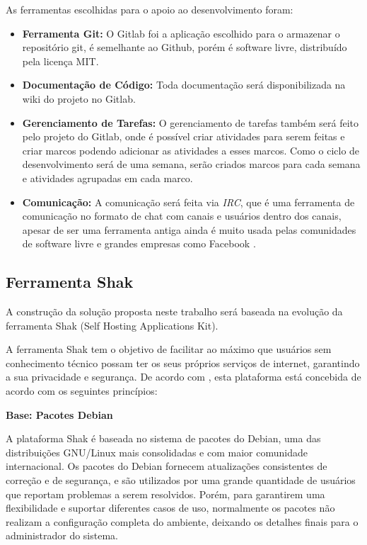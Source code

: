As ferramentas escolhidas para o apoio ao desenvolvimento foram:
\begin{itemize}
  \item \textbf{Ferramenta Git:} O Gitlab foi a aplicação escolhido para o armazenar o
  repositório git, é semelhante ao Github, porém é software livre, distribuído pela
  licença MIT\cite{gitlab}.
  \item \textbf{Documentação de Código:} Toda documentação será disponibilizada
  na wiki do projeto no Gitlab.
  \item \textbf{Gerenciamento de Tarefas:} O gerenciamento de tarefas também será
  feito pelo projeto do Gitlab, onde é possível criar atividades para serem feitas
  e criar marcos podendo adicionar as atividades a esses marcos. Como o ciclo de
  desenvolvimento será de uma semana, serão criados marcos para cada semana e atividades
  agrupadas em cada marco.
  \item \textbf{Comunicação:} A comunicação será feita via \textit{IRC}, que é uma ferramenta
  de comunicação no formato de chat com canais e usuários dentro dos canais,
  apesar de ser uma ferramenta antiga ainda é muito usada pelas comunidades de software
  livre e grandes empresas como Facebook \cite{artigofacebook}.
\end{itemize}

\subsection{Ferramenta Shak}

A construção da solução proposta neste trabalho será baseada na evolução da ferramenta Shak
(Self Hosting Applications Kit).

A ferramenta Shak tem o objetivo de facilitar ao máximo que usuários sem conhecimento
técnico possam ter os seus próprios serviços de internet, garantindo a sua privacidade
e segurança. De acordo com , esta plataforma está concebida 
de acordo com os seguintes princípios:

\textbf{Base: Pacotes Debian}

A plataforma Shak é baseada no sistema de pacotes do Debian, uma das distribuições 
GNU/Linux mais consolidadas e com maior comunidade internacional. Os
pacotes do Debian fornecem atualizações consistentes de correção e de segurança,
e são utilizados por uma grande quantidade de usuários que reportam problemas a
serem resolvidos. Porém, para garantirem uma flexibilidade e suportar diferentes
casos de uso, normalmente os pacotes não realizam a configuração completa do ambiente,
deixando os detalhes finais para o administrador do sistema.

